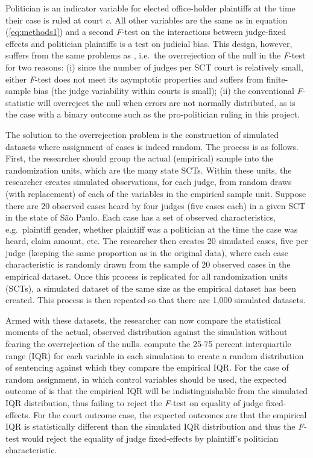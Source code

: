\documentclass[11pt]{article}
\newcommand{\refp}[1]{(\ref{#1})}
\begin{document}
Politician is an indicator variable for elected office-holder plaintiffs at the time their case is ruled at court $c$. All other variables are the same as in equation \refp{eq:methods1} and a second \emph{F}-test on the interactions between judge-fixed effects and politician plaintiffs is a test on judicial bias. This design, however, suffers from the same problems as \citet{AbramsJudgesVaryTheir2012}, i.e.~the overrejection of the null in the \emph{F}-test for two reasons: (i) since the number of judges per SCT court is relatively small, either \emph{F}-test does not meet its asymptotic properties and suffers from finite-sample bias (the judge variability within courts is small); (ii) the conventional \emph{F}-statistic will overreject the null when errors are not normally distributed, as is the case with a binary outcome such as the pro-politician ruling in this project.

The solution to the overrejection problem is the construction of simulated datasets where assignment of cases is indeed random. The process is as follows. First, the researcher should group the actual (empirical) sample into the randomization units, which are the many state SCTs. Within these units, the researcher creates simulated observations, for each judge, from random draws (with replacement) of each of the variables in the empirical sample unit. Suppose there are 20 observed cases heard by four judges (five cases each) in a given SCT in the state of São Paulo. Each case has a set of observed characteristics, e.g.~plaintiff gender, whether plaintiff was a politician at the time the case was heard, claim amount, etc. The researcher then creates 20 simulated cases, five per judge (keeping the same proportion as in the original data), where each case characteristic is randomly drawn from the sample of 20 observed cases in the empirical dataset. Once this process is replicated for all randomization units (SCTs), a simulated dataset of the same size as the empirical dataset has been created. This process is then repeated so that there are 1,000 simulated datasets.

Armed with these datasets, the researcher can now compare the statistical moments of the actual, observed distribution against the simulation without fearing the overrejection of the nulls. \citet{AbramsJudgesVaryTheir2012} compute the 25-75 percent interquartile range (IQR) for each variable in each simulation to create a random distribution of sentencing against which they compare the empirical IQR. For the case of random assignment, in which control variables should be used, the expected outcome of is that the empirical IQR will be indistinguishable from the simulated IQR distribution, thus failing to reject the \emph{F}-test on equality of judge fixed-effects. For the court outcome case, the expected outcomes are that the empirical IQR is statistically different than the simulated IQR distribution and thus the \emph{F-}test would reject the equality of judge fixed-effects by plaintiff's politician characteristic.
\end{document}
